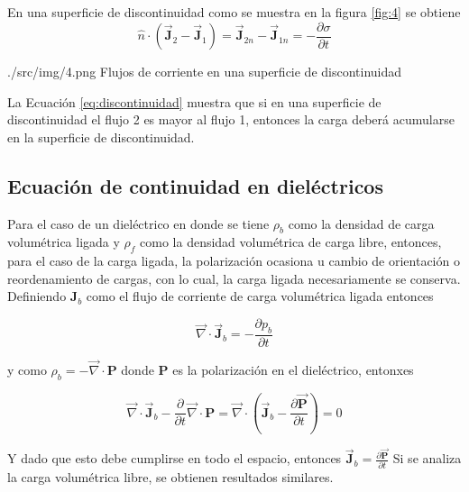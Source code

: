 En una superficie de discontinuidad como se muestra en la figura \ref{fig:4} se obtiene
\begin{equation}
    \hat{n} \cdot \left(\vec{\textbf{J}}_2 - \vec{\textbf{J}}_1 \right) = \vec{\textbf{J}}_{2n} - \vec{\textbf{J}}_{1n} = - \frac{\partial{\sigma}}{\partial{t}}
    \label{eq:discontinuidad}
\end{equation}

\imagen
    {./src/img/4.png}
    {Flujos de corriente en una superficie de discontinuidad}
    {\label{fig:4}}

La Ecuación \eqref{eq:discontinuidad} muestra que si en una superficie de discontinuidad el flujo 2 es mayor al flujo 1, entonces la carga deberá acumularse en la superficie de discontinuidad.

\subsection{Ecuación de continuidad en dieléctricos}
Para el caso de un dieléctrico en donde se tiene $\rho_b$ como la densidad de carga volumétrica ligada y $\rho_f$ como la densidad volumétrica de carga libre, entonces, para el caso de la carga ligada, la polarización ocasiona u cambio de orientación o reordenamiento de cargas, con lo cual, la carga ligada necesariamente se conserva. Definiendo $\textbf{J}_b$ como el flujo de corriente de carga volumétrica ligada entonces

\begin{equation}
    \vec{\nabla} \cdot \vec{\textbf{J}}_b = - \frac{\partial{p}_b}{\partial{t}}
    \label{eq:ligada}
\end{equation}

y como $\rho_b = - \vec{\nabla} \cdot \textbf{P}$ donde $\textbf{P}$ es la polarización en el dieléctrico, entonxes

\begin{equation}
    \vec{\nabla} \cdot \vec{\textbf{J}}_b - \frac{\partial}{\partial{t}} \vec{\nabla} \cdot \textbf{P} = \vec{\nabla} \cdot \left( \vec{\textbf{J}}_b - \frac{\partial{\vec{\textbf{P}}}}{\partial{t}} \right) = 0
\end{equation}

Y dado que esto debe cumplirse en todo el espacio, entonces $\vec{\textbf{J}}_b = \frac{\partial{\vec{\textbf{P}}}}{\partial{t}}$
Si se analiza la carga volumétrica libre, se obtienen resultados similares.






